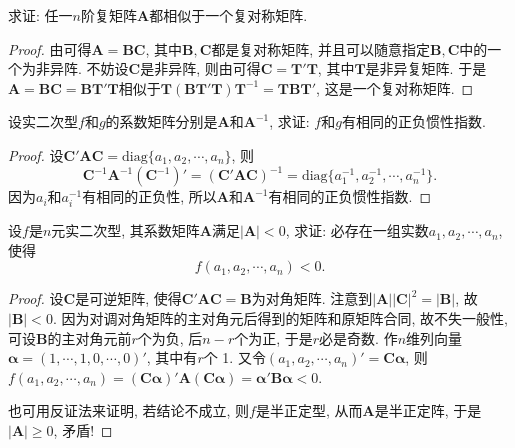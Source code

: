\documentclass[../../main.tex]{subfiles}%
\begin{document}
\begin{proposition}
求证: 任一$n$阶复矩阵$\boldsymbol{A}$都相似于一个复对称矩阵.
\end{proposition}
\begin{proof}

由可得$\boldsymbol{A}=\boldsymbol{B}\boldsymbol{C}$, 其中$\boldsymbol{B}, \boldsymbol{C}$都是复对称矩阵, 并且可以随意指定$\boldsymbol{B}, \boldsymbol{C}$中的一个为非异阵. 不妨设$\boldsymbol{C}$是非异阵, 则由可得$\boldsymbol{C}=\boldsymbol{T}'\boldsymbol{T}$, 其中$\boldsymbol{T}$是非异复矩阵. 于是$\boldsymbol{A}=\boldsymbol{B}\boldsymbol{C}=\boldsymbol{B}\boldsymbol{T}'\boldsymbol{T}$相似于$\boldsymbol{T}(\boldsymbol{B}\boldsymbol{T}'\boldsymbol{T})\boldsymbol{T}^{-1}=\boldsymbol{T}\boldsymbol{B}\boldsymbol{T}'$, 这是一个复对称矩阵. 

\end{proof}

\begin{proposition}\label{proposition:实对称阵和逆的二次型有相同的正负惯性指数}
设实二次型$f$和$g$的系数矩阵分别是$\boldsymbol{A}$和$\boldsymbol{A}^{-1}$, 求证: $f$和$g$有相同的正负惯性指数.
\end{proposition}
\begin{proof}

设$\boldsymbol{C}'\boldsymbol{A}\boldsymbol{C}=\text{diag}\{a_1, a_2, \cdots, a_n\}$, 则
\[
\boldsymbol{C}^{-1}\boldsymbol{A}^{-1}(\boldsymbol{C}^{-1})'=(\boldsymbol{C}'\boldsymbol{A}\boldsymbol{C})^{-1}=\text{diag}\{a_1^{-1}, a_2^{-1}, \cdots, a_n^{-1}\}.
\]
因为$a_i$和$a_i^{-1}$有相同的正负性, 所以$\boldsymbol{A}$和$\boldsymbol{A}^{-1}$有相同的正负惯性指数.

\end{proof}

\begin{proposition}\label{proposition:系数阵的行列式小于零的二次型必存在小于零的一点}
设$f$是$n$元实二次型, 其系数矩阵$\boldsymbol{A}$满足$|\boldsymbol{A}|<0$, 求证: 必存在一组实数$a_1, a_2, \cdots, a_n$, 使得
\[
f(a_1, a_2, \cdots, a_n)<0.
\]
\end{proposition}
\begin{proof}

设$\boldsymbol{C}$是可逆矩阵, 使得$\boldsymbol{C}'\boldsymbol{A}\boldsymbol{C}=\boldsymbol{B}$为对角矩阵. 注意到$|\boldsymbol{A}||\boldsymbol{C}|^2 = |\boldsymbol{B}|$, 故$|\boldsymbol{B}|<0$. 因为对调对角矩阵的主对角元后得到的矩阵和原矩阵合同, 故不失一般性, 可设$\boldsymbol{B}$的主对角元前$r$个为负, 后$n - r$个为正, 于是$r$必是奇数. 作$n$维列向量$\boldsymbol{\alpha}=(1, \cdots, 1, 0, \cdots, 0)'$, 其中有$r$个 1. 又令$(a_1, a_2, \cdots, a_n)'=\boldsymbol{C}\boldsymbol{\alpha}$, 则$f(a_1, a_2, \cdots, a_n)=(\boldsymbol{C}\boldsymbol{\alpha})'\boldsymbol{A}(\boldsymbol{C}\boldsymbol{\alpha})=\boldsymbol{\alpha}'\boldsymbol{B}\boldsymbol{\alpha}<0$. 

也可用反证法来证明, 若结论不成立, 则$f$是半正定型, 从而$\boldsymbol{A}$是半正定阵, 于是$|\boldsymbol{A}|\geqslant  0$, 矛盾!

\end{proof}
\end{document}
